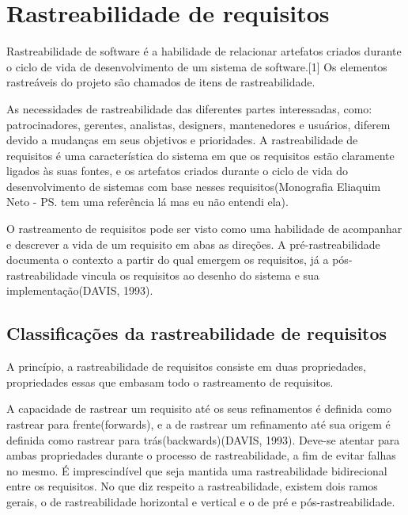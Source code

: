 \section{Rastreabilidade de requisitos}
Rastreabilidade de software é a habilidade de relacionar artefatos criados durante o ciclo de vida de desenvolvimento de um sistema de software.[1] Os elementos rastreáveis do projeto são chamados de itens de rastreabilidade.

As necessidades de rastreabilidade das diferentes partes interessadas, como: patrocinadores, gerentes, analistas, designers, mantenedores e usuários, diferem devido a mudanças em seus objetivos e prioridades. A rastreabilidade de requisitos é uma característica do sistema em que os requisitos estão claramente ligados às suas fontes, e os artefatos criados durante o ciclo de vida do desenvolvimento de sistemas com base nesses requisitos(Monografia Eliaquim Neto - PS. tem uma referência lá mas eu não entendi ela).

O rastreamento de requisitos pode ser visto como uma habilidade de acompanhar e descrever a vida de um requisito em abas as direções. A pré-rastreabilidade documenta o contexto a partir do qual emergem os requisitos, já a pós-rastreabilidade vincula os requisitos ao desenho do sistema e sua implementação(DAVIS, 1993).
\subsection{Classificações da rastreabilidade de requisitos}
A princípio, a rastreabilidade de requisitos consiste em duas propriedades, propriedades essas que embasam todo o rastreamento de requisitos.

A capacidade de rastrear um requisito até os seus refinamentos é definida como rastrear para frente(forwards), e a de rastrear um refinamento até sua origem é definida como rastrear para trás(backwards)(DAVIS, 1993). Deve-se atentar para ambas propriedades durante o processo de rastreabilidade, a fim de evitar falhas no mesmo. É imprescindível que seja mantida uma rastreabilidade bidirecional entre os requisitos.
No que diz respeito a rastreabilidade, existem dois ramos gerais, o de rastreabilidade horizontal e vertical e o de pré e pós-rastreabilidade.


